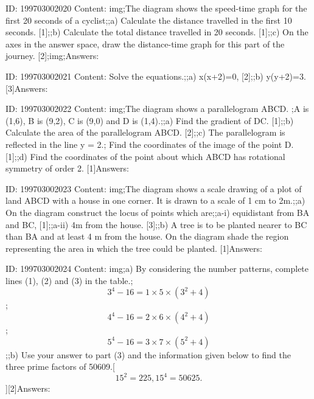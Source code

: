 \documentclass{article}
\begin{document}
ID: 199703002020
Content:
img;The diagram shows the speed-time graph for the first 20 seconds of a cyclist;;a) Calculate the distance travelled in the first 10 seconds. [1];;b) Calculate the total distance travelled in 20 seconds. [1];;c) On the axes in the answer space, draw the distance-time graph for this part of the journey. [2];img;Answers:

ID: 199703002021
Content:
Solve the equations.;;a) x(x+2)=0, [2];;b) y(y+2)=3. [3]Answers:

ID: 199703002022
Content:
img;The diagram shows a parallelogram ABCD. ;A is (1,6), B is (9,2), C is (9,0) and D is (1,4).;;a) Find the gradient of DC. [1];;b) Calculate the area of the parallelogram ABCD. [2];;c) The parallelogram is reflected in the line y = 2.; Find the coordinates of the image of the point D. [1];;d) Find the coordinates of the point about which ABCD has rotational symmetry of order 2. [1]Answers:

ID: 199703002023
Content:
img;The diagram shows a scale drawing of a plot of land ABCD with a house in one corner. It is drawn to a scale of 1 cm to 2m.;;a) On the diagram construct the locus of points which are;;a-i) equidistant from BA and BC,  [1];;a-ii) 4m from the house. [3];;b) A tree is to be planted nearer to BC than BA and at least 4 m from the house. On the diagram shade the region representing the area in which the tree could be planted. [1]Answers:

ID: 199703002024
Content:
img;a) By considering the number patterns, complete lines (1), (2) and (3) in the table.;$$3^4-16=1 \times 5 \times (3^2+4)$$;$$4^4-16=2 \times 6 \times (4^2+4)$$;$$5^4-16=3 \times 7 \times (5^2+4)$$;;b) Use your answer to part (3) and the information given below to find the three prime factors of 50609.[$$15^2=225, 15^4= 50625.$$][2]Answers:
\end{document}
